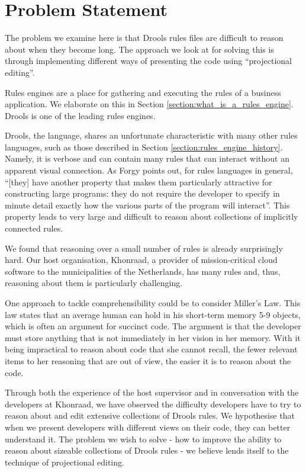 \section{Problem Statement}
\label{section:problem_statement}

The problem we examine here is that Drools rules files are difficult to reason about when they become long.
The approach we look at for solving this is through implementing different ways of presenting the code using ``projectional editing''.

Rules engines are a place for gathering and executing the rules of a business application.
We elaborate on this in Section \ref{section:what_is_a_rules_engine}.
Drools is one of the leading rules engines.

Drools, the language, shares an unfortunate characteristic with many other rules languages, such as those described in Section \ref{section:rules_engine_history}.
Namely, it is verbose and can contain many rules that can interact without an apparent visual connection.
As Forgy\cite{forgy1989rete} points out, for rules languages in general, ``[they] have another property that makes them particularly attractive for constructing large programs: they do not require the developer to specify in minute detail exactly how the various parts of the program will interact''.
This property leads to very large and difficult to reason about collections of implicitly connected rules.

We found that reasoning over a small number of rules is already surprisingly hard.
Our host organisation, Khonraad, a provider of mission-critical cloud software to the municipalities of the Netherlands, has many rules and, thus, reasoning about them is particularly challenging.

One approach to tackle comprehensibility could be to consider Miller's Law\cite{miller1956magical}.
This law states that an average human can hold in his short-term memory 5-9 objects, which is often an argument for succinct code.
The argument is that the developer must store anything that is not immediately in her vision in her memory.
With it being impractical to reason about code that she cannot recall, the fewer relevant items to her reasoning that are out of view, the easier it is to reason about the code.

Through both the experience of the host supervisor and in conversation with the developers at Khonraad, we have observed the difficulty developers have to try to reason about and edit extensive collections of Drools rules.
We hypothesise that when we present developers with different views on their code, they can better understand it.
The problem we wish to solve - how to improve the ability to reason about sizeable collections of Drools rules - we believe lends itself to the technique of projectional editing.

